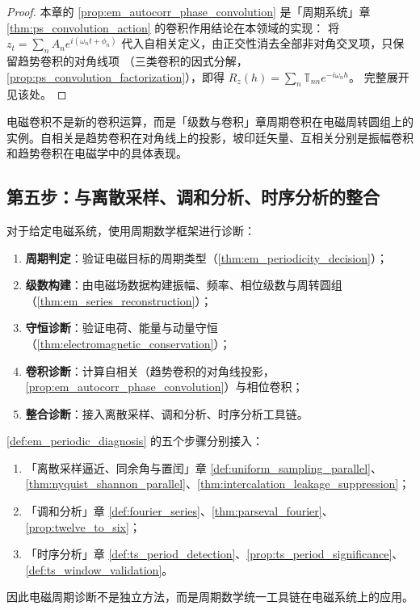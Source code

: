 \begin{proof}
本章的 \cref{prop:em_autocorr_phase_convolution} 是「周期系统」章 \cref{thm:ps_convolution_action} 的卷积作用结论在本领域的实现：
将 $z_t=\sum_n A_n e^{i(\omega_n t+\phi_n)}$ 代入自相关定义，由正交性消去全部非对角交叉项，只保留趋势卷积的对角线项
（三类卷积的因式分解，\cref{prop:ps_convolution_factorization}），即得 $R_z(h)=\sum_n\mathbb T_{nn}e^{-i\omega_n h}$。
完整展开见该处。
\end{proof}

\begin{remark}[电磁卷积与周期卷积的关系]\label{rem:em_convolution_relation}
电磁卷积不是新的卷积运算，而是「级数与卷积」章周期卷积在电磁周转圆组上的实例。自相关是趋势卷积在对角线上的投影，坡印廷矢量、互相关分别是振幅卷积和趋势卷积在电磁学中的具体表现。
\end{remark}

\subsection{第五步：与离散采样、调和分析、时序分析的整合}

\begin{definition}[电磁周期诊断流程]\label{def:em_periodic_diagnosis}
对于给定电磁系统，使用周期数学框架进行诊断：
\begin{enumerate}[label=(\roman*)]
    \item \textbf{周期判定}：验证电磁目标的周期类型（\cref{thm:em_periodicity_decision}）；
    \item \textbf{级数构建}：由电磁场数据构建振幅、频率、相位级数与周转圆组（\cref{thm:em_series_reconstruction}）；
    \item \textbf{守恒诊断}：验证电荷、能量与动量守恒（\cref{thm:electromagnetic_conservation}）；
    \item \textbf{卷积诊断}：计算自相关（趋势卷积的对角线投影，\cref{prop:em_autocorr_phase_convolution}）与相位卷积；
    \item \textbf{整合诊断}：接入离散采样、调和分析、时序分析工具链。
\end{enumerate}
\end{definition}

\begin{theorem}[电磁周期诊断流程与三章接口]\label{thm:em_diagnosis_integration}
\cref{def:em_periodic_diagnosis} 的五个步骤分别接入：
\begin{enumerate}[label=(\roman*)]
    \item 「离散采样逼近、同余角与置闰」章 \cref{def:uniform_sampling_parallel}、\cref{thm:nyquist_shannon_parallel}、\cref{thm:intercalation_leakage_suppression}；
    \item 「调和分析」章 \cref{def:fourier_series}、\cref{thm:parseval_fourier}、\cref{prop:twelve_to_six}；
    \item 「时序分析」章 \cref{def:ts_period_detection}、\cref{prop:ts_period_significance}、\cref{def:ts_window_validation}。
\end{enumerate}
因此电磁周期诊断不是独立方法，而是周期数学统一工具链在电磁系统上的应用。
\end{theorem}

